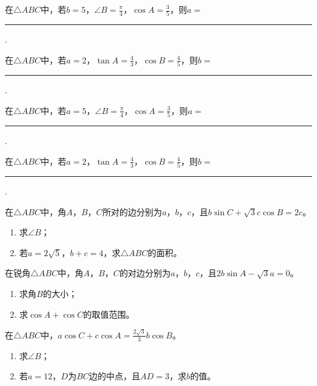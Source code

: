 \begin{homework}
在$\triangle ABC$中，若$b=5$，$\angle B=\frac{\pi}{4}$，$\cos A=\frac{3}{5}$，则$a=$\rule{1cm}{0.15mm}.
\end{homework}

\begin{homework}
在$\triangle ABC$中，若$a=2$，$\tan A=\frac{4}{3}$，$\cos B=\frac{4}{5}$，则$b=$\rule{1cm}{0.15mm}.
\end{homework}

\begin{homework}
在$\triangle ABC$中，若$a=5$，$\angle B=\frac{\pi}{4}$，$\cos A=\frac{3}{5}$，则$a=$\rule{1cm}{0.15mm}.
\end{homework}

\begin{homework}
在$\triangle ABC$中，若$a=2$，$\tan A=\frac{4}{3}$，$\cos B=\frac{4}{5}$，则$b=$\rule{1cm}{0.15mm}.
\end{homework}

\begin{homework}
在$\triangle ABC$中，角$A$，$B$，$C$所对的边分别为$a$，$b$，$c$，且$b\sin C+\sqrt{3}c\cos B=2c$。
\begin{enumerate}
    \item 求$\angle B$；
    \item 若$a=2\sqrt{5}$，$b+c=4$，求$\triangle ABC$的面积。
\end{enumerate}

\end{homework}

\begin{homework}
在锐角$\triangle ABC$中，角$A$，$B$，$C$的对边分别为$a$，$b$，$c$，且$2b\sin A-\sqrt{3}a=0$。
\begin{enumerate}
    \item 求角$B$的大小；
    \item 求$\cos A+\cos C$的取值范围。
\end{enumerate}

\end{homework}

\begin{homework}
在$\triangle ABC$中，$a\cos C+c\cos A=\frac{2\sqrt{3}}{3}b\cos B$。
\begin{enumerate}
    \item 求$\angle B$；
    \item 若$a=12$，$D$为$BC$边的中点，且$AD=3$，求$b$的值。
\end{enumerate}

\end{homework}